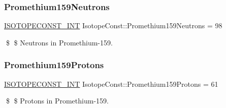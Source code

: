 \subsubsection{\texorpdfstring{Promethium159\+Neutrons}{Promethium159Neutrons}}
{\footnotesize\ttfamily \mbox{\hyperlink{group___isotope_const-_macros_ga5f18360b3e99483a35c32d789e62621c}{I\+S\+O\+T\+O\+P\+E\+C\+O\+N\+S\+T\+\_\+\+I\+NT}} Isotope\+Const\+::\+Promethium159\+Neutrons = 98}

\$ \$ Neutrons in Promethium-\/159. \mbox{\label{group___isotope_const-_promethium-_pm159_ga4ee14a762a17dd26e6ff61cfe0f90a5a}} 
\subsubsection{\texorpdfstring{Promethium159\+Protons}{Promethium159Protons}}
{\footnotesize\ttfamily \mbox{\hyperlink{group___isotope_const-_macros_ga5f18360b3e99483a35c32d789e62621c}{I\+S\+O\+T\+O\+P\+E\+C\+O\+N\+S\+T\+\_\+\+I\+NT}} Isotope\+Const\+::\+Promethium159\+Protons = 61}

\$ \$ Protons in Promethium-\/159. 